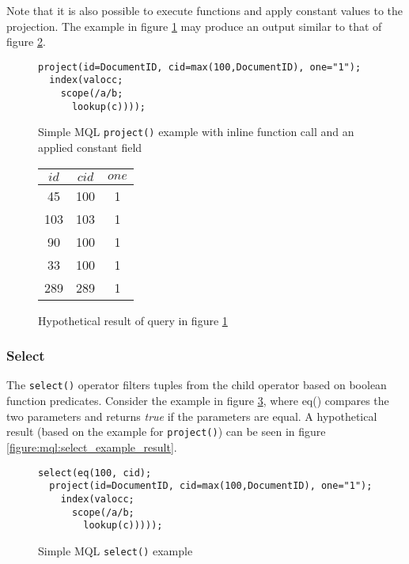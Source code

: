 Note that it is also possible to execute functions and apply constant values to
the projection. The example in figure \ref{figure:mql:project_example2} may
produce an output similar to that of figure
\ref{figure:mql:project_example2_result}.

\begin{figure}[!h]
\centering
\begin{Verbatim}
project(id=DocumentID, cid=max(100,DocumentID), one="1");
  index(valocc;
    scope(/a/b;
      lookup(c))));
\end{Verbatim}
\caption{Simple MQL \texttt{project()} example with inline function call 
and an applied constant field}
\label{figure:mql:project_example2}
\end{figure}

\begin{figure}[!h]
\centering
\begin{tabular}{|c | c | c |}
\hline
$id$ & $cid$ & $one$ \\ \hline
45 & 100 & 1 \\ \hline
103 & 103 & 1 \\ \hline
90 & 100 & 1 \\ \hline
33 & 100 & 1 \\ \hline
289 & 289 & 1 \\ \hline
\end{tabular}
\caption{Hypothetical result of query in figure
\ref{figure:mql:project_example2}}
\label{figure:mql:project_example2_result}
\end{figure}

\subsubsection{Select}
The \texttt{select()} operator filters tuples from the child operator based on
boolean function predicates. Consider the example in figure
\ref{figure:mql:select_example}, where eq() compares the two parameters and
returns \textit{true} if the parameters are equal. A hypothetical result (based
on the example for \texttt{project()}) can be seen in figure
\ref{figure:mql:select_example_result}.

\begin{figure}[!h]
\centering
\begin{Verbatim}
select(eq(100, cid);
  project(id=DocumentID, cid=max(100,DocumentID), one="1");
    index(valocc;
      scope(/a/b;
        lookup(c)))));
\end{Verbatim}
\caption{Simple MQL \texttt{select()} example}
\label{figure:mql:select_example}
\end{figure}

